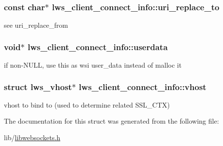 \subsubsection[{\texorpdfstring{uri\+\_\+replace\+\_\+to}{uri\_replace\_to}}]{\setlength{\rightskip}{0pt plus 5cm}const char$\ast$ lws\+\_\+client\+\_\+connect\+\_\+info\+::uri\+\_\+replace\+\_\+to}\hypertarget{structlws__client__connect__info_a9959ba103d3d2484e559a9f7879eebe3}{}\label{structlws__client__connect__info_a9959ba103d3d2484e559a9f7879eebe3}
see uri\+\_\+replace\+\_\+from 
\subsubsection[{\texorpdfstring{userdata}{userdata}}]{\setlength{\rightskip}{0pt plus 5cm}void$\ast$ lws\+\_\+client\+\_\+connect\+\_\+info\+::userdata}\hypertarget{structlws__client__connect__info_a9831b9f9ab54a1aec4bb15324f1c3836}{}\label{structlws__client__connect__info_a9831b9f9ab54a1aec4bb15324f1c3836}
if non-\/\+N\+U\+LL, use this as wsi user\+\_\+data instead of malloc it 
\subsubsection[{\texorpdfstring{vhost}{vhost}}]{\setlength{\rightskip}{0pt plus 5cm}struct lws\+\_\+vhost$\ast$ lws\+\_\+client\+\_\+connect\+\_\+info\+::vhost}\hypertarget{structlws__client__connect__info_a3893181d728f326f9f5b47c1459cb8be}{}\label{structlws__client__connect__info_a3893181d728f326f9f5b47c1459cb8be}
vhost to bind to (used to determine related S\+S\+L\+\_\+\+C\+TX) 

The documentation for this struct was generated from the following file\+:\begin{DoxyCompactItemize}
\item 
lib/\hyperlink{libwebsockets_8h}{libwebsockets.\+h}\end{DoxyCompactItemize}
